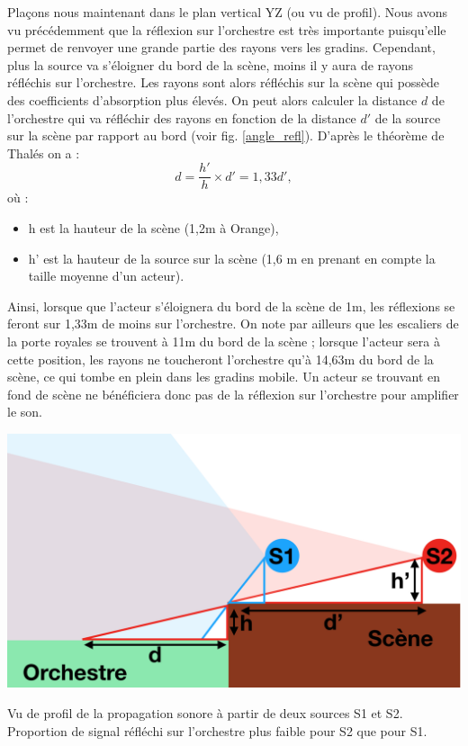Plaçons nous maintenant dans le plan vertical YZ (ou vu de profil). Nous avons vu précédemment que la réflexion sur l'orchestre est très importante puisqu'elle permet de renvoyer une grande partie des rayons vers les gradins. Cependant, plus la source va s'éloigner du bord de la scène, moins il y aura de rayons réfléchis sur l'orchestre. Les rayons sont alors réfléchis sur la scène qui possède des coefficients d'absorption plus élevés. On peut alors calculer la distance $d$ de l'orchestre qui va réfléchir des rayons en fonction de la distance $d'$ de la source sur la scène par rapport au bord (voir fig. \ref{angle_refl}). D'après le théorème de Thalés on a :
\begin{equation}
d = \frac{h'}{h}\times d' = 1,33d',
\end{equation}
où :
\begin{itemize}
\item h est la hauteur de la scène (1,2m à Orange),
\item h' est la hauteur de la source sur la scène (1,6 m en prenant en compte la taille moyenne d'un acteur).
\end{itemize}
Ainsi, lorsque que l'acteur s'éloignera du bord de la scène de 1m, les réflexions se feront sur 1,33m de moins sur l'orchestre. On note par ailleurs que les escaliers de la porte royales se trouvent à 11m du bord de la scène ; lorsque l'acteur sera à cette position, les rayons ne toucheront l'orchestre qu'à 14,63m du bord de la scène, ce qui tombe en plein dans les gradins mobile. Un acteur se trouvant en fond de scène ne bénéficiera donc pas de la réflexion sur l'orchestre pour amplifier le son.
\begin{figureth}
	\includegraphics[width=0.8\linewidth]{images/angle_refl}
	\caption{Vu de profil de la propagation sonore à partir de deux sources S1 et S2. Proportion de signal réfléchi sur l'orchestre plus faible pour S2 que pour S1.}
	\label{angle_refl}
\end{figureth}


